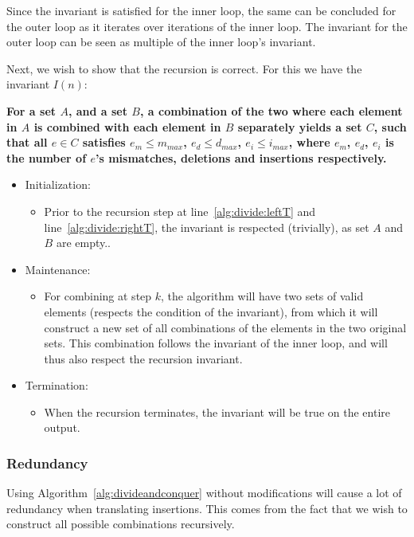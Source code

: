 \documentclass[12pt]{article}
\theoremstyle{definition}
\begin{document}
Since the invariant is satisfied for the inner loop, the same can be concluded for the outer loop as it iterates over iterations of the inner loop. The invariant for the outer loop can be seen as multiple of the inner loop's invariant.

Next, we wish to show that the recursion is correct. For this we have the invariant $I(n)$:

\textbf{For a set $A$, and a set $B$, a combination of the two where each element in $A$ is combined with each element in $B$ separately yields a set $C$, such that all $e \in C$ satisfies $e_m \leq m_{max}$, $e_d \leq d_{max}$, $e_i \leq i_{max}$, where $e_m$, $e_d$, $e_i$ is the number of $e$'s mismatches, deletions and insertions respectively.}


\begin{itemize}
\item Initialization:
\begin{itemize}
	\item[] Prior to the recursion step at line~\ref{alg:divide:leftT} and line~\ref{alg:divide:rightT}, the invariant is respected (trivially), as set $A$ and $B$ are empty..
\end{itemize}

\item Maintenance:
\begin{itemize}
	\item[] For combining at step $k$, the algorithm will have two sets of valid elements (respects the condition of the invariant), from which it will construct a new set of all combinations of the elements in the two original sets. This combination follows the invariant of the inner loop, and will thus also respect the recursion invariant.
\end{itemize}

\item Termination:
\begin{itemize}
	\item[] When the recursion terminates, the invariant will be true on the entire output.
\end{itemize}
\end{itemize}


\subsubsection{Redundancy}

Using Algorithm~\ref{alg:divideandconquer} without modifications will cause a lot of redundancy when translating insertions. This comes from the fact that we wish to construct all possible combinations recursively.
\end{document}
